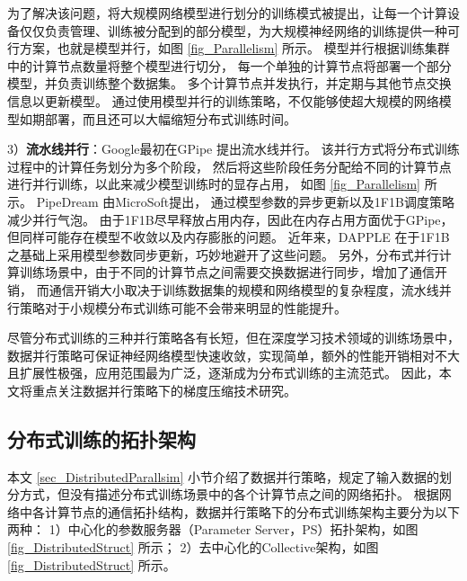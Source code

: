 \documentclass{xdupgthesis}
\begin{document}
为了解决该问题，将大规模网络模型进行划分的训练模式被提出，让每一个计算设备仅仅负责管理、训练被分配到的部分模型，为大规模神经网络的训练提供一种可行方案，也就是模型并行，如图 \ref{fig_Parallelism}   所示。
模型并行根据训练集群中的计算节点数量将整个模型进行切分，
每一个单独的计算节点将部署一个部分模型，并负责训练整个数据集。
多个计算节点并发执行，并定期与其他节点交换信息以更新模型。
通过使用模型并行的训练策略，不仅能够使超大规模的网络模型如期部署，而且还可以大幅缩短分布式训练时间。

3）\textbf{流水线并行}：Google最初在GPipe \cite{huang2019gpipe} 提出流水线并行。
该并行方式将分布式训练过程中的计算任务划分为多个阶段，
然后将这些阶段任务分配给不同的计算节点进行并行训练，以此来减少模型训练时的显存占用，
如图 \ref{fig_Parallelism}   所示。
PipeDream \cite{harlap2018pipedream} 由MicroSoft提出，
通过模型参数的异步更新以及1F1B调度策略减少并行气泡。
由于1F1B尽早释放占用内存，因此在内存占用方面优于GPipe，但同样可能存在模型不收敛以及内存膨胀的问题。
近年来，DAPPLE \cite{fan2021dapple} 在于1F1B之基础上采用模型参数同步更新，巧妙地避开了这些问题。
另外，分布式并行计算训练场景中，由于不同的计算节点之间需要交换数据进行同步，增加了通信开销，
而通信开销大小取决于训练数据集的规模和网络模型的复杂程度，流水线并行策略对于小规模分布式训练可能不会带来明显的性能提升。

尽管分布式训练的三种并行策略各有长短，但在深度学习技术领域的训练场景中，数据并行策略可保证神经网络模型快速收敛，实现简单，额外的性能开销相对不大且扩展性极强，应用范围最为广泛，逐渐成为分布式训练的主流范式。
因此，本文将重点关注数据并行策略下的梯度压缩技术研究。

\subsection{分布式训练的拓扑架构}
本文 \ref{sec_DistributedParallsim} 小节介绍了数据并行策略，规定了输入数据的划分方式，但没有描述分布式训练场景中的各个计算节点之间的网络拓扑。
根据网络中各计算节点的通信拓扑结构，数据并行策略下的分布式训练架构主要分为以下两种：
1）中心化的参数服务器（Parameter Server，PS）拓扑架构，如图 \ref{fig_DistributedStruct}  所示；
2）去中心化的Collective架构，如图 \ref{fig_DistributedStruct}  所示。
\end{document}
